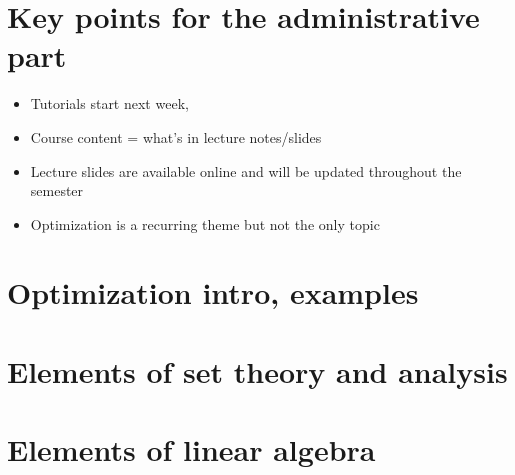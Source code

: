 \documentclass[letterpaper,10pt,english]{jupyterBook}
\begin{document}
\chapter{Key points for the administrative part}
\label{\detokenize{01.introduction:key-points-for-the-administrative-part}}\begin{itemize}
\item {} 
\sphinxAtStartPar
Tutorials start next week, 

\item {} 
\sphinxAtStartPar
Course content = what’s in lecture notes/slides

\item {} 
\sphinxAtStartPar
Lecture slides are available online and will be updated throughout the semester

\item {} 
\sphinxAtStartPar
Optimization is a recurring theme but not the only topic

\end{itemize}

\sphinxstepscope


\chapter{Optimization intro, examples}
\label{\detokenize{02.optimization_intro:optimization-intro-examples}}\label{\detokenize{02.optimization_intro::doc}}

\sphinxstepscope


\chapter{Elements of set theory and analysis}
\label{\detokenize{03.set_theory:elements-of-set-theory-and-analysis}}\label{\detokenize{03.set_theory::doc}}

\sphinxstepscope


\chapter{Elements of linear algebra}
\label{\detokenize{04.linear_algebra:elements-of-linear-algebra}}\label{\detokenize{04.linear_algebra::doc}}
\end{document}
